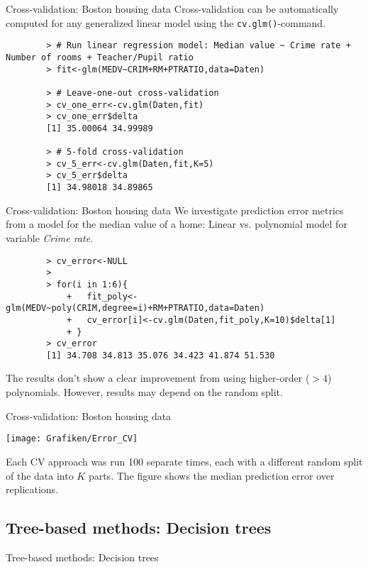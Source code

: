 \documentclass{beamer}
\newcommand{\code}[1]{\texttt{#1}}
\begin{document}
\begin{frame}[fragile]{Cross-validation: Boston housing data}
	Cross-validation can be automatically computed for any generalized linear model using the \code{cv.glm()}-command.
	\begin{lstlisting}
		> # Run linear regression model: Median value ~ Crime rate + Number of rooms + Teacher/Pupil ratio
		> fit<-glm(MEDV~CRIM+RM+PTRATIO,data=Daten)
		
		> # Leave-one-out cross-validation
		> cv_one_err<-cv.glm(Daten,fit)
		> cv_one_err$delta
		[1] 35.00064 34.99989
		
		> # 5-fold cross-validation
		> cv_5_err<-cv.glm(Daten,fit,K=5)
		> cv_5_err$delta
		[1] 34.98018 34.89865
	\end{lstlisting}
\end{frame}

\begin{frame}[fragile]{Cross-validation: Boston housing data}
	We investigate prediction error metrics from a model for the median value of a home: Linear vs. polynomial model for variable \textit{Crime rate}.
	\begin{lstlisting}
		> cv_error<-NULL
		>
		> for(i in 1:6){
			+   fit_poly<-glm(MEDV~poly(CRIM,degree=i)+RM+PTRATIO,data=Daten)
			+   cv_error[i]<-cv.glm(Daten,fit_poly,K=10)$delta[1]
			+ }
		> cv_error
		[1] 34.708 34.813 35.076 34.423 41.874 51.530
	\end{lstlisting}
	The results don't show a clear improvement from using higher-order ($>4$) polynomials. However, results may depend on the random split. 
\end{frame}

\begin{frame}[fragile]{Cross-validation: Boston housing data}
	\begin{center}
		\texttt{[image: Grafiken/Error\_CV]}
	\end{center}
	Each CV approach was run 100 separate times, each with a different random split of the data into $K$ parts. The figure shows the median prediction error over replications.
\end{frame}



\subsection{Tree-based methods: Decision trees}

\begin{frame}
	\begin{center}
		\Large{\textcolor{dkblue}{Tree-based methods: Decision trees}}
	\end{center}
\end{frame}
\end{document}
